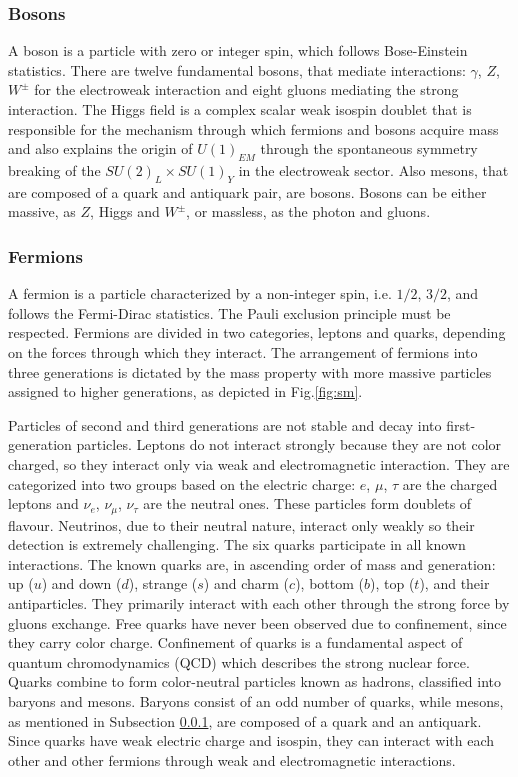 \subsubsection{Bosons}\label{bosons}
A boson is a particle with zero or integer spin, which follows Bose-Einstein statistics.
There are twelve fundamental bosons, that mediate interactions: $\gamma$, $Z$, $W^{\pm}$
for the electroweak interaction and eight gluons mediating the strong interaction.
The Higgs field is a complex scalar weak isospin doublet that is 
responsible for the mechanism through which fermions and
bosons acquire mass and also explains the origin of $U (1)_{EM}$ 
through the spontaneous
symmetry breaking of the $SU (2)_L \times SU (1)_Y$ in the 
electroweak sector. Also mesons, that are composed of a quark 
and antiquark pair, are bosons. Bosons can be either massive, as $Z$, 
Higgs and $W^{\pm}$, or massless, as the photon and gluons.

\subsubsection{Fermions}
A fermion is a particle characterized by a non-integer spin, i.e. $1/2$, $3/2$, and follows the Fermi-Dirac statistics. 
The Pauli exclusion principle must be respected. Fermions are divided in two categories, leptons and quarks, depending 
on the forces through which they interact.  The arrangement of fermions into three generations is dictated by the mass property 
with more massive particles assigned to higher generations, as 
depicted in Fig.\ref{fig:sm}.

Particles of second and third generations are not stable and decay into first-generation 
particles. Leptons do not interact strongly because they are not color charged, so they interact only via 
weak and electromagnetic interaction. They are categorized into 
two groups based on the electric charge: $e$, $\mu$, $\tau$ 
are the charged leptons and $\nu_e$, $\nu_{\mu}$, $\nu_{\tau}$ 
are the neutral ones. These particles form doublets of flavour. 
Neutrinos, due to their neutral nature, interact only weakly so 
their detection is extremely challenging. The six quarks 
participate in all known interactions. The known quarks are, 
in ascending order of mass and generation: up ($u$) and down 
($d$), strange ($s$) and charm ($c$), bottom ($b$), top ($t$), 
and their antiparticles. They primarily interact with each 
other through the strong force by gluons exchange. Free quarks 
have never been observed due to confinement, since they carry 
color charge. Confinement of quarks is a fundamental aspect of 
quantum chromodynamics (QCD) which describes the 
strong nuclear force. Quarks combine to form color-neutral 
particles known as hadrons, classified into baryons and mesons. 
Baryons consist of an odd number of quarks, while mesons, 
as mentioned in Subsection \ref{bosons}, are composed of a quark 
and an antiquark. Since quarks have weak electric charge and 
isospin, they can interact with each other and other fermions 
through weak and electromagnetic interactions.

